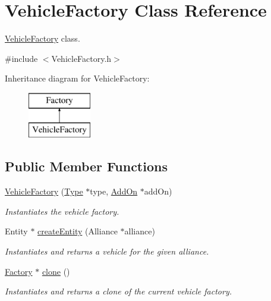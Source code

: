 \hypertarget{classVehicleFactory}{}\section{Vehicle\+Factory Class Reference}
\label{classVehicleFactory}


\hyperlink{classVehicleFactory}{Vehicle\+Factory} class.  




{\ttfamily \#include $<$Vehicle\+Factory.\+h$>$}

Inheritance diagram for Vehicle\+Factory\+:\begin{figure}[H]
\begin{center}
\leavevmode
\includegraphics[height=2.000000cm]{classVehicleFactory}
\end{center}
\end{figure}
\subsection*{Public Member Functions}
\begin{DoxyCompactItemize}
\item 
\hyperlink{classVehicleFactory_a9bc9faf52aef1ad02193b3640b661f59}{Vehicle\+Factory} (\hyperlink{classType}{Type} $\ast$type, \hyperlink{classAddOn}{Add\+On} $\ast$add\+On)
\begin{DoxyCompactList}\small\item\em Instantiates the vehicle factory. \end{DoxyCompactList}\item 
Entity $\ast$ \hyperlink{classVehicleFactory_a3f34221921fd58cf83fd9bc8e3d8798f}{create\+Entity} (Alliance $\ast$alliance)
\begin{DoxyCompactList}\small\item\em Instantiates and returns a vehicle for the given alliance. \end{DoxyCompactList}\item 
\hyperlink{classFactory}{Factory} $\ast$ \hyperlink{classVehicleFactory_a6d874e37b573b491a49e303209ac42cd}{clone} ()
\begin{DoxyCompactList}\small\item\em Instantiates and returns a clone of the current vehicle factory. \end{DoxyCompactList}\end{DoxyCompactItemize}


